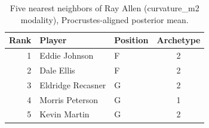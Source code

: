\begin{table}[htbp]
  \centering\small
  \begin{tabular}{rllc}
    \toprule
    Rank & Player & Position & Archetype \\
    \midrule
    1 & Eddie Johnson & F & 2 \\
    2 & Dale Ellis & F & 2 \\
    3 & Eldridge Recasner & G & 2 \\
    4 & Morris Peterson & G & 1 \\
    5 & Kevin Martin & G & 2 \\
    \bottomrule
  \end{tabular}
  \caption{Five nearest neighbors of Ray Allen (curvature_m2 modality), Procrustes-aligned posterior mean.}
  \label{tab:Ray_Allen_neighbors_curvature_m2}
\end{table}


